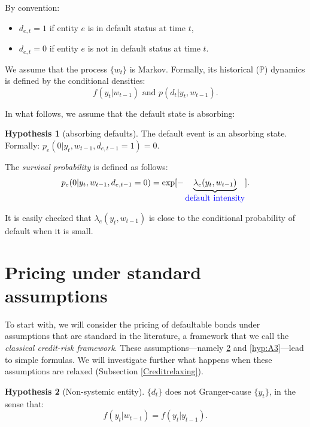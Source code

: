 \documentclass[
  12pt,
]{book}
\providecommand{\tightlist}{%
  \setlength{\itemsep}{0pt}\setlength{\parskip}{0pt}}
\theoremstyle{definition}
\theoremstyle{definition}
\theoremstyle{definition}
\theoremstyle{definition}
\newtheorem{hypothesis}{Hypothesis}[chapter]
\theoremstyle{remark}
\begin{document}
By convention:

\begin{itemize}
\tightlist
\item
  \(d_{e, t} = 1\) if entity \(e\) is in default status at time \(t\),
\item
  \(d_{e, t} = 0\) if entity \(e\) is not in default status at time \(t\).
\end{itemize}

We assume that the process \(\{w_t\}\) is Markov. Formally, its historical (\(\mathbb{P}\)) dynamics is defined by the conditional densities:
\[
f (y_t  |  w_{t-1}) \mbox{ and }p ( d_t  |  y_t, w_{t-1} ).
\]

In what follows, we assume that the default state is absorbing:

\begin{hypothesis}[absorbing defaults]
\protect\hypertarget{hyp:A4}{}\label{hyp:A4}The default event is an absorbing state. Formally: \(p_e ( 0 | y_t, w_{t-1}, d_{e,t-1}=1 ) = 0\).
\end{hypothesis}

The \emph{survival probability} is defined as follows:
\begin{equation}
p_e ( 0  |  y_t, w_{t-1}, d_{e,t-1}=0 ) = \exp[-\underbrace{\lambda_e ( y_t, w_{t-1})}_{\color{blue}{\mbox{default intensity}}}].\label{eq:survival}
\end{equation}

It is easily checked that \(\lambda_e ( y_t, w_{t-1})\) is close to the conditional probability of default when it is small.

\hypertarget{CreditStandard}{%
\section{Pricing under standard assumptions}\label{CreditStandard}}

To start with, we will consider the pricing of defaultable bonds under assumptions that are standard in the literature, a framework that we call the \emph{classical credit-risk framework}. These assumptions---namely \ref{hyp:A1} and \ref{hyp:A3}---lead to simple formulas. We will investigate further what happens when these assumptions are relaxed (Subsection \ref{Creditrelaxing}).

\begin{hypothesis}[Non-systemic entity]
\protect\hypertarget{hyp:A1}{}\label{hyp:A1}\(\{d_t\}\) does not Granger-cause \(\{y_t\}\), in the sense that:
\[
f(y_t|w_{t-1}) = f(y_t|y_{t-1}).
\]
\end{hypothesis}
\end{document}
